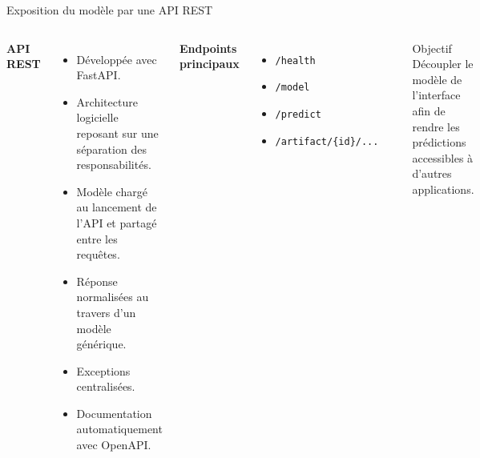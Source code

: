 \begin{frame}{Exposition du modèle par une API REST}
	\begin{columns}[T]
		
		\textbf{API REST}
		\begin{itemize}
			\item Développée avec FastAPI.
			\item Architecture logicielle reposant sur une séparation des responsabilités.
			\item Modèle chargé au lancement de l'API et partagé entre les requêtes.
			\item Réponse normalisées au travers d'un modèle générique.
			\item Exceptions centralisées.
			\item Documentation automatiquement avec OpenAPI.
		\end{itemize}
		
		\vspace{0.1cm}
		
		\textbf{Endpoints principaux}
		\begin{itemize}
			\item \texttt{/health}
			\item \texttt{/model}
			\item \texttt{/predict}
			\item \texttt{/artifact/\{id\}/...}
		\end{itemize}
		
		
		\begin{center}
		\end{center}
		
		\vspace{0.4cm}
		
		\begin{block}{Objectif}
		Découpler le modèle de l'interface afin de rendre les prédictions accessibles à d'autres applications.
		\end{block}
	\end{columns}
\end{frame}

